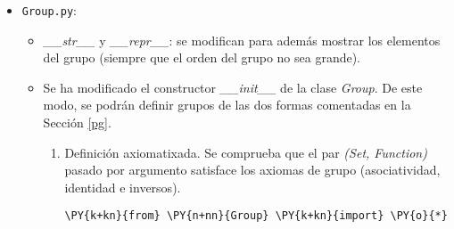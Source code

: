 \begin{itemize}
usaremos las función lambda que nos ofrece Python.

    \begin{tcolorbox}[breakable, size=fbox, boxrule=1pt, pad at break*=1mm,colback=cellbackground, colframe=cellborder]
\begin{Verbatim}[commandchars=\\\{\}]
\PY{n}{S} \PY{o}{=} \PY{n}{Set}\PY{p}{(}\PY{p}{\PYZob{}}\PY{l+m+mi}{0}\PY{p}{,}\PY{l+m+mi}{1}\PY{p}{,}\PY{l+m+mi}{2}\PY{p}{\PYZcb{}}\PY{p}{)}
\PY{n}{F} \PY{o}{=} \PY{n}{Function}\PY{p}{(}\PY{n}{S}\PY{o}{*}\PY{n}{S}\PY{p}{,} \PY{n}{S}\PY{p}{,}\PY{k}{lambda} \PY{n}{x}\PY{p}{:} \PY{p}{(}\PY{n}{x}\PY{p}{[}\PY{l+m+mi}{0}\PY{p}{]}\PY{o}{+}\PY{n}{x}\PY{p}{[}\PY{l+m+mi}{1}\PY{p}{]}\PY{p}{)}\PY{o}{\PYZpc{}}\PY{k}{3})
\PY{n+nb}{print}\PY{p}{(}\PY{n}{F}\PY{p}{)}
\end{Verbatim}
\end{tcolorbox}

    \begin{Verbatim}[commandchars=\\\{\}]
    f((0, 1))=1
    f((1, 2))=0
    f((2, 1))=0
    f((0, 0))=0
    f((1, 1))=2
    f((2, 0))=2
    f((0, 2))=2
    f((2, 2))=1
    f((1, 0))=1
    \end{Verbatim}

    

\item  \texttt{Group.py}:

\begin{itemize}
    \item \textit{\_\_str\_\_} y \textit{\_\_repr\_\_}: se modifican
      para además mostrar los elementos del grupo (siempre que el orden del
      grupo no sea grande).
    \item Se ha modificado el constructor \textit{\_\_init\_\_} de la clase
      \textit{Group}. De este modo, se podrán definir grupos de las dos
      formas comentadas en la Sección \ref{pg}.

  \begin{enumerate}

  \item Definición axiomatixada. Se comprueba que el par
    \textit{(Set, Function)} pasado por argumento satisface los axiomas de grupo (asociatividad, identidad e inversos).


    \begin{tcolorbox}[breakable, size=fbox, boxrule=1pt, pad at break*=1mm,colback=cellbackground, colframe=cellborder]
\begin{Verbatim}[commandchars=\\\{\}]
\PY{k+kn}{from} \PY{n+nn}{Group} \PY{k+kn}{import} \PY{o}{*}
\end{Verbatim}
\end{tcolorbox}


\end{enumerate}
\end{itemize}
\end{itemize}
